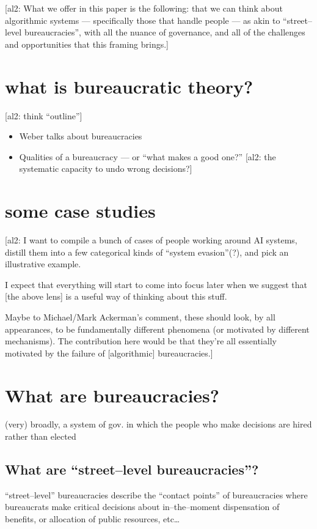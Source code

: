 \documentclass[10pt]{article}
\newcommand{\ali}[1]{{\color{Red}[al2: #1]}}
\begin{document}
\ali{What we offer in this paper is the following: that we can think about algorithmic systems --- specifically those that handle people --- as akin to ``street--level bureaucracies'', with all the nuance of governance, and all of the challenges and opportunities that this framing brings.}

\section{what is bureaucratic theory?}
\ali{think ``outline''}
\begin{itemize}
  \item Weber talks about bureaucracies
  \item Qualities of a bureaucracy --- or ``what makes a good one?''
      \ali{the systematic capacity to undo wrong decisions?}
\end{itemize}


\section{some case studies}
\ali{I want to compile a bunch of cases of people working around AI systems, distill them into a few categorical kinds of ``system evasion''(?), and pick an illustrative example.

I expect that everything will start to come into focus later when we suggest that [the above lens] is a useful way of thinking about this stuff.

Maybe to Michael/Mark Ackerman's comment, these should look, by all appearances, to be fundamentally different phenomena (or motivated by different mechanisms). The contribution here would be that they're all essentially motivated by the failure of [algorithmic] bureaucracies.}


\section{What are bureaucracies?}
(very) broadly, a system of gov. in which the people who make decisions are hired rather than elected

\subsection{What are ``street--level bureaucracies''?}
``street--level'' bureaucracies describe the ``contact points'' of bureaucracies where bureaucrats make critical decisions about in--the--moment dispensation of benefits, or allocation of public resources, etc\dots
\end{document}
